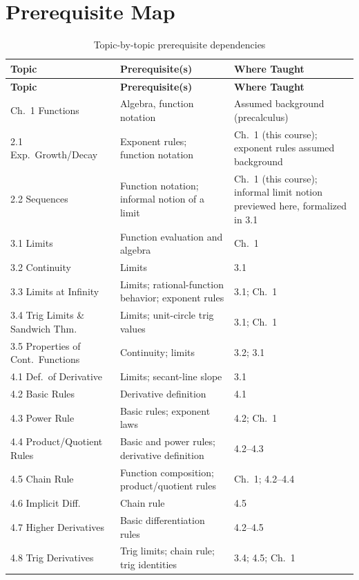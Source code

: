 \documentclass[11pt]{article}
\begin{document}
\section{Prerequisite Map}

\begin{longtable}{p{3.4cm}p{5.3cm}p{4.8cm}}
\caption{Topic-by-topic prerequisite dependencies} \\
\toprule
\textbf{Topic} & \textbf{Prerequisite(s)} & \textbf{Where Taught} \\
\midrule
\endfirsthead
\toprule
\textbf{Topic} & \textbf{Prerequisite(s)} & \textbf{Where Taught} \\
\midrule
\endhead
\bottomrule
\endfoot
Ch.\ 1 Functions & Algebra, function notation & Assumed background (precalculus) \\
2.1 Exp.\ Growth/Decay & Exponent rules; function notation & Ch.\ 1 (this course); exponent rules assumed background \\
2.2 Sequences & Function notation; informal notion of a limit & Ch.\ 1 (this course); informal limit notion previewed here, formalized in 3.1 \\
3.1 Limits & Function evaluation and algebra & Ch.\ 1 \\
3.2 Continuity & Limits & 3.1 \\
3.3 Limits at Infinity & Limits; rational-function behavior; exponent rules & 3.1; Ch.\ 1 \\
3.4 Trig Limits \& Sandwich Thm. & Limits; unit-circle trig values & 3.1; Ch.\ 1 \\
3.5 Properties of Cont.\ Functions & Continuity; limits & 3.2; 3.1 \\
4.1 Def.\ of Derivative & Limits; secant-line slope & 3.1 \\
4.2 Basic Rules & Derivative definition & 4.1 \\
4.3 Power Rule & Basic rules; exponent laws & 4.2; Ch.\ 1 \\
4.4 Product/Quotient Rules & Basic and power rules; derivative definition & 4.2--4.3 \\
4.5 Chain Rule & Function composition; product/quotient rules & Ch.\ 1; 4.2--4.4 \\
4.6 Implicit Diff. & Chain rule & 4.5 \\
4.7 Higher Derivatives & Basic differentiation rules & 4.2--4.5 \\
4.8 Trig Derivatives & Trig limits; chain rule; trig identities & 3.4; 4.5; Ch.\ 1 \\

\end{longtable}
\end{document}
